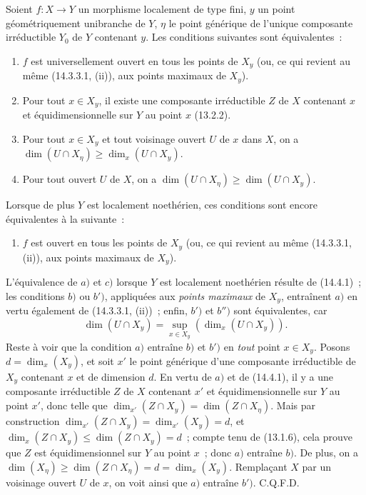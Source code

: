 \begin{corollary}[14.4.2]
\label{IV.14.4.2-fr}
Soient $f:X\to Y$ un morphisme localement de type fini, $y$ un point
géométriquement unibranche de $Y$, $\eta$ le point générique de l'unique composante
irréductible $Y_0$ de $Y$ contenant $y$. Les conditions suivantes sont
équivalentes~:
\begin{enumerate}[label=\emph{\alph*)}]
  \item $f$ est universellement ouvert en tous les points de $X_y$ (ou, ce qui
  revient au même (14.3.3.1, (ii)), aux points maximaux de $X_y$).
  \item Pour tout $x\in X_y$, il existe une composante irréductible $Z$ de $X$
  contenant $x$ et équidimensionnelle sur $Y$ au point $x$ (13.2.2).
  \item[b$'$)] Pour tout $x\in X_y$ et tout voisinage ouvert $U$ de $x$ dans $X$,
  on a $\dim(U\cap X_\eta)\geq\dim_x(U\cap X_y)$.
  \item[b$''$)] Pour tout ouvert $U$ de $X$, on a
  $\dim(U\cap X_\eta)\geq\dim(U\cap X_y)$.
\end{enumerate}


Lorsque de plus $Y$ est localement noethérien, ces conditions sont encore
équivalentes à la suivante~:
\begin{enumerate}[label=\emph{\alph*)}]
  \item[c)] $f$ est ouvert en tous les points de $X_y$ (ou, ce qui revient au même
  (14.3.3.1, (ii)), aux points maximaux de $X_y$).
\end{enumerate}
\end{corollary}

L'équivalence de $a)$ et $c)$ lorsque $Y$ est localement noethérien résulte de
(14.4.1)~; les conditions $b)$ ou $b')$, appliquées aux \emph{points maximaux} de
$X_y$, entraînent $a)$ en vertu également de (14.3.3.1, (ii))~; enfin, $b')$ et
$b'')$ sont équivalentes, car
\[
  \dim(U\cap X_y)=\sup_{x\in X_y}(\dim_x(U\cap X_y)).
\]
Reste à voir que la condition $a)$ entraîne $b)$ et $b')$ en \emph{tout} point
$x\in X_y$. Posons $d=\dim_x(X_y)$, et soit $x'$ le point générique d'une
composante irréductible de $X_y$ contenant $x$ et de dimension $d$. En vertu de
$a)$ et de (14.4.1), il y a une composante irréductible $Z$ de $X$ contenant $x'$
et équidimensionnelle sur $Y$ au point $x'$, donc telle que
$\dim_{x'}(Z\cap X_y)=\dim(Z\cap X_\eta)$. Mais par construction
$\dim_{x'}(Z\cap X_y)=\dim_{x'}(X_y)=d$, et
$\dim_x(Z\cap X_y)\leq\dim(Z\cap X_y)=d$~; compte tenu de (13.1.6), cela prouve
que $Z$ est équidimensionnel sur $Y$ au point $x$~; donc $a)$ entraîne $b)$. De
plus, on a $\dim(X_\eta)\geq\dim(Z\cap X_\eta)=d=\dim_x(X_y)$. Remplaçant $X$ par
un voisinage ouvert $U$ de $x$, on voit ainsi que $a)$ entraîne $b')$. C.Q.F.D.

